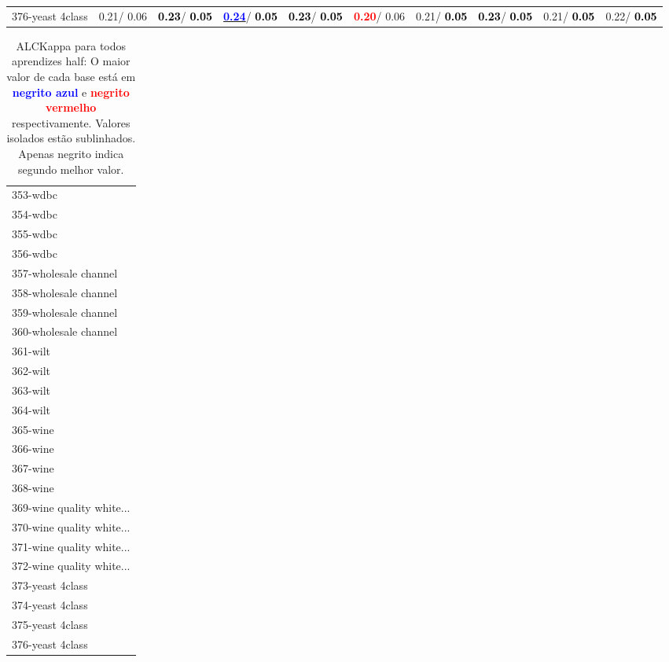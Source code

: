 \begin{table}[h]
\begin{center}
{\begin{tabular}{lc|c|c|c|c|c|c|c|c}
376-yeast 4class &   0.21/  0.06 & \textcolor{black}{\textbf{  0.23}}/\textcolor{black}{\textbf{  0.05}} & \underline{\textcolor{blue}{\textbf{  0.24}}}/\textcolor{black}{\textbf{  0.05}} & \textcolor{black}{\textbf{  0.23}}/\textcolor{black}{\textbf{  0.05}} & \textcolor{red}{\textbf{  0.20}}/  0.06 &   0.21/\textcolor{black}{\textbf{  0.05}} & \textcolor{black}{\textbf{  0.23}}/\textcolor{black}{\textbf{  0.05}} &   0.21/\textcolor{black}{\textbf{  0.05}} &   0.22/\textcolor{black}{\textbf{  0.05}} \\\end{tabular}}\label{stratsALCKappa11AllReduxhalfa}
\end{center}
\end{table}
\begin{table}[h]
\caption{ALCKappa para todos aprendizes half: O maior valor de cada base está em \textcolor{blue}{\textbf{negrito azul}} e \textcolor{red}{\textbf{negrito vermelho}} respectivamente. Valores isolados estão sublinhados. Apenas negrito indica segundo melhor valor.}
\begin{center}\begin{tabular}{l}
 & \\ \hline 353-wdbc &  \\
354-wdbc &  \\
355-wdbc &  \\
356-wdbc &  \\
357-wholesale channel &  \\
358-wholesale channel &  \\
359-wholesale channel &  \\ \hline
360-wholesale channel &  \\
361-wilt &  \\
362-wilt &  \\
363-wilt &  \\
364-wilt &  \\
365-wine &  \\
366-wine &  \\ \hline
367-wine &  \\
368-wine &  \\
369-wine quality white... &  \\
370-wine quality white... &  \\
371-wine quality white... &  \\
372-wine quality white... &  \\
373-yeast 4class &  \\ \hline
374-yeast 4class &  \\
375-yeast 4class &  \\
376-yeast 4class &  \\\end{tabular}\label{stratsALCKappa11AllReduxhalfb}
\end{center}
\end{table}